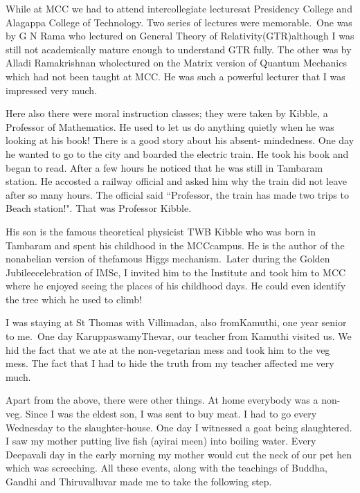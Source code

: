 While at MCC we had to attend intercollegiate lectures\break at Presidency 
College and Alagappa College of Technology. Two series of lectures were 
memorable.\ One was by G N Rama who lectured on General Theory of 
Relativity(GTR)\break although I was still not academically mature enough to 
understand GTR fully. The other was by Alladi Ramakrishnan who\break lectured 
on the Matrix version of Quantum Mechanics which had not been taught at 
MCC. He was such a powerful lecturer that I was impressed very much.

Here also there were moral instruction classes; they were taken by 
Kibble, a Professor of Mathematics. He used to let us do anything 
quietly when he was looking at his book! There is a good story about his 
absent- mindedness. One day he wanted to go to the city and boarded the 
electric train. He took his book and began to read. After a few hours he 
noticed that he was still in Tambaram station. He accosted a railway 
official and asked him why the train did not leave after so many hours. 
The official said ``Professor, the train has made two trips to Beach 
station!". That was Professor Kibble.

 
His son is the famous theoretical physicist TWB Kibble	who was born in 
Tambaram and spent his childhood in the MCC\break campus. He is the author of 
the nonabelian version of the\break famous Higgs mechanism.\ Later during the 
Golden Jubilee\break celebration of IMSc, I invited him to the Institute and 
took him to MCC where he enjoyed seeing the places of his childhood 
days. He could even identify the tree which he used to climb!

  
I was staying at St Thomas with Villimadan, also from\break Kamuthi, one year 
senior to me.\ One day Karuppaswamy\break Thevar, our teacher from Kamuthi 
visited us. We hid the fact that we ate at the non-vegetarian mess and 
took him to the veg mess. The fact that I had to hide the truth from my 
teacher affect\-ed me very much.


Apart from the above, there were other things. At home every\-body was a 
non-veg. Since I was the eldest son, I was sent to buy meat. I had to go 
every Wednesday to the slaughter-house. One day I witnessed a goat being 
slaughtered. I saw my mother putting live fish (ayirai meen) into 
boiling water. Every Deepa\-vali day in the early morning my mother would 
cut the neck of our pet hen which was screeching. All these events, 
along with the teachings of Buddha, Gandhi and Thiruvalluvar made me to 
take the following step.

